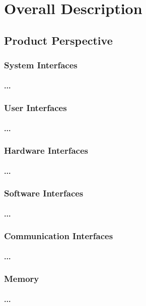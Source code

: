 \documentclass[runningheads,a4paper]{llncs}
\begin{document}
\section{Overall Description}

\subsection{Product Perspective}

\subsubsection{System Interfaces}
\paragraph{...}
\subsubsection{User Interfaces}
\paragraph{...}
\subsubsection{Hardware Interfaces}
\paragraph{...}
\subsubsection{Software Interfaces}
\paragraph{...}
\subsubsection{Communication Interfaces}
\paragraph{...}
\subsubsection{Memory}
\paragraph{...}
\end{document}

